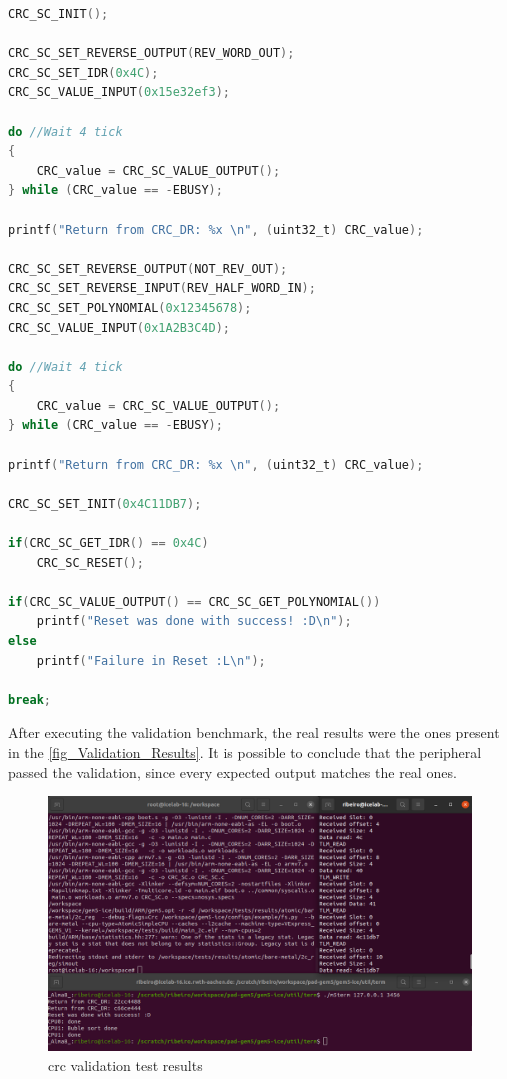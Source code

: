 \begin{lstlisting}[language=C, caption={CRC validation code}, label=validationCodeCRC]
CRC_SC_INIT();

CRC_SC_SET_REVERSE_OUTPUT(REV_WORD_OUT);
CRC_SC_SET_IDR(0x4C);
CRC_SC_VALUE_INPUT(0x15e32ef3);       

do //Wait 4 tick
{
	CRC_value = CRC_SC_VALUE_OUTPUT();
} while (CRC_value == -EBUSY);

printf("Return from CRC_DR: %x \n", (uint32_t) CRC_value);

CRC_SC_SET_REVERSE_OUTPUT(NOT_REV_OUT);
CRC_SC_SET_REVERSE_INPUT(REV_HALF_WORD_IN);
CRC_SC_SET_POLYNOMIAL(0x12345678);
CRC_SC_VALUE_INPUT(0x1A2B3C4D);

do //Wait 4 tick
{
	CRC_value = CRC_SC_VALUE_OUTPUT();
} while (CRC_value == -EBUSY);

printf("Return from CRC_DR: %x \n", (uint32_t) CRC_value); 

CRC_SC_SET_INIT(0x4C11DB7);

if(CRC_SC_GET_IDR() == 0x4C)
	CRC_SC_RESET();

if(CRC_SC_VALUE_OUTPUT() == CRC_SC_GET_POLYNOMIAL())
	printf("Reset was done with success! :D\n");
else
	printf("Failure in Reset :L\n");

break;
\end{lstlisting}

After executing the validation benchmark, the real results were the ones present in the \autoref{fig_Validation_Results}. It is possible to conclude that the 
peripheral passed the validation, since every expected output matches the real ones. 

\begin{figure}[H]
	\centering
 	\includegraphics[width=0.8\linewidth]{Images/Validation_Results.png} 
 	\caption{\gls*{crc} validation test results}
	\label{fig_Validation_Results}
\end{figure}


